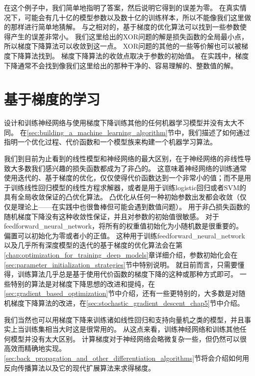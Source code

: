在这个例子中，我们简单地指明了答案，然后说明它得到的误差为零。
在真实情况下，可能会有几十亿的模型参数以及数十亿的训练样本，所以不能像我们这里做的那样进行简单地猜解。
与之相对的，基于梯度的优化算法可以找到一些参数使得产生的误差非常小。
我们这里给出的XOR问题的解是损失函数的全局最小点，所以梯度下降算法可以收敛到这一点。
XOR问题的其他的一些等价解也可以被梯度下降算法找到。
梯度下降算法的收敛点取决于参数的初始值。
在实践中，梯度下降通常不会找到像我们这里给出的那种干净的、容易理解的、整数值的解。

\section{基于梯度的学习}
\label{sec:gradient_based_learning}

设计和训练神经网络与使用梯度下降训练其他的任何机器学习模型并没有太大不同。
在\ref{sec:building_a_machine_learning_algorithm}节中，我们描述了如何通过指明一个优化过程、代价函数和一个模型族来构建一个机器学习算法。

我们到目前为止看到的线性模型和神经网络的最大区别，在于神经网络的非线性导致大多数我们感兴趣的损失函数都成为了非凸的。
这意味着神经网络的训练通常使用迭代的、基于梯度的优化，仅仅使得代价函数达到一个非常小的值；而不是用于训练线性回归模型的线性方程求解器，或者是用于训练logistic回归或者SVM的具有全局收敛保证的凸优化算法。
凸优化从任何一种初始参数出发都会收敛（仅仅是理论上——在实践中也很鲁棒但可能会遇到数值问题）。
用于非凸损失函数的随机梯度下降没有这种收敛性保证，并且对参数的初始值很敏感。
对于\gls{feedforward_neural_network}，将所有的权重值初始化为小随机数是很重要的。
偏置可以初始化为零或者小的正值。
这种用于训练\gls{feedforward_neural_network}以及几乎所有深度模型的迭代的基于梯度的优化算法会在第\ref{chap:optimization_for_training_deep_models}章详细介绍，参数初始化会在\ref{sec:parameter_initialization_strategies}节中特别说明。
就目前而言，只需要懂得，训练算法几乎总是基于使用代价函数的梯度下降的这种或那种方式即可。
一些特别的算法是对梯度下降思想的改进和提纯，在\ref{sec:gradient_based_optimization}节中介绍，还有一些更特别的，大多数是对随机梯度下降算法的改进，在\ref{sec:stochastic_gradient_descent_chap5}节中介绍。


我们当然也可以用梯度下降来训练诸如线性回归和支持向量机之类的模型，并且事实上当训练集相当大时这是很常用的。
从这点来看，训练神经网络和训练其他任何模型并没有太大区别。
计算梯度对于神经网络会略微复杂一些，但仍然可以很高效而精确地实现。
\ref{sec:back_propagation_and_other_differentiation_algorithms}节将会介绍如何用反向传播算法以及它的现代扩展算法来求得梯度。

